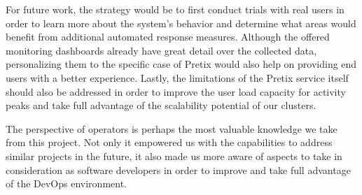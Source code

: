 \documentclass[12pt]{article}
\begin{document}
For future work, the strategy would be to first conduct trials with real users in order to learn more about the system's behavior and determine what areas would 
benefit from additional automated response measures.
Although the offered monitoring dashboards already have great detail over the collected data, personalizing them to the specific case of Pretix would also help 
on providing end users with a better experience.
Lastly, the limitations of the Pretix service itself should also be addressed in order to improve the user load capacity for activity peaks and take full advantage 
of the scalability potential of our clusters.

The perspective of operators is perhaps the most valuable knowledge we take from this project.
Not only it empowered us with the capabilities to address similar projects in the future, it also made us more aware of aspects to take in consideration as 
software developers in order to improve and take full advantage of the DevOps environment.
\end{document}
